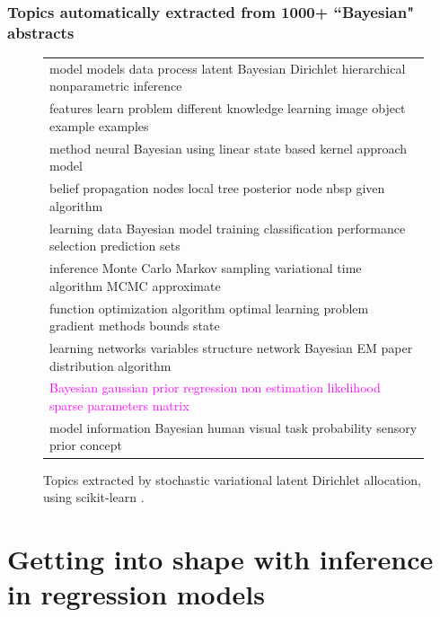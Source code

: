 \documentclass[10pt]{beamer}
\begin{document}
\begin{frame}
  \frametitle{Topics automatically extracted from 1000+ ``Bayesian" abstracts}
  \begin{figure}
    \footnotesize
    \begin{tabular}{|l|}
    \hline
      \textcolor{vert}{model models data process latent Bayesian Dirichlet hierarchical nonparametric inference}\\
      features learn problem different knowledge learning image object example examples\\
      method neural Bayesian using linear state based kernel approach model\\
      belief propagation nodes local tree posterior node nbsp given algorithm\\
      learning data Bayesian model training classification performance selection prediction sets\\
      \textcolor{bleu}{inference Monte Carlo Markov sampling variational time algorithm MCMC approximate}\\
      function optimization algorithm optimal learning problem gradient methods bounds state\\
      learning networks variables structure network Bayesian EM paper distribution algorithm\\
      \textcolor{magenta}{Bayesian gaussian prior regression non estimation likelihood sparse parameters matrix}\\
      model information Bayesian human visual task probability sensory prior concept\\
    \hline
    \end{tabular}
    \caption{Topics extracted by stochastic variational latent Dirichlet allocation, using {scikit-learn} \citep{}.
    \label{f:bayesianTopics}}
    \end{figure}
\end{frame}

\section{Getting into shape with inference in regression models}
\end{document}
